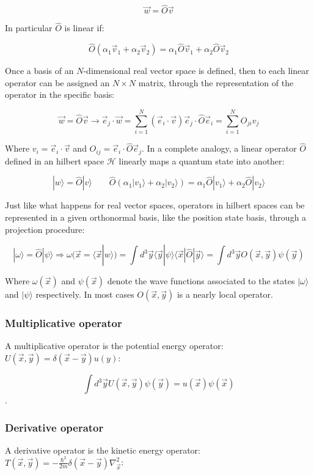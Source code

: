 	$$\vec{w} = \hat{O}\vec{v}$$

	In particular $\hat{O}$ is linear if:

	$$\hat{O}(\alpha_1\vec{v}_1 + \alpha_2\vec{v}_2) = \alpha_1\hat{O}\vec{v}_1 + \alpha_2\hat{O}\vec{v}_2$$

	Once a basis of an $N$-dimensional real vector space is defined, then to each linear operator can be assigned an $N\times N$ matrix, through the representation of the operator in the specific basis:

	$$\vec{w} = \hat{O}\vec{v}\rightarrow \vec{e}_j\cdot\vec{w} = \sum\limits_{i=1}^N(\vec{e}_i\cdot\vec{v})\vec{e}_j\cdot\hat{O}\vec{e}_i = \sum\limits_{i=1}^NO_{ji}v_j$$

	Where $v_i = \vec{e}_i\cdot \vec{v}$ and $O_{ij} = \vec{e}_i\cdot\hat{O}\vec{e}_j$.
	In a complete analogy, a linear operator $\hat{O}$ defined in an hilbert space $\mathcal{H}$ linearly maps a quantum state into another:

	$$|w\rangle = \hat{O}|v\rangle\qquad \hat{O}(\alpha_1|v_1\rangle + \alpha_2|v_2\rangle) = \alpha_1\hat{O}|v_1\rangle +  \alpha_2\hat{O}|v_2\rangle$$

	Just like what happens for real vector spaces, operators in hilbert spaces can be represented in a given orthonormal basis, like the position state basis, through a projection procedure:

	$$|\omega\rangle = \hat{O}|\psi\rangle\Rightarrow \omega(\vec{x} = \langle\vec{x}|w\rangle) = \int d^3\vec{y}\langle\vec{y}|\psi\rangle\langle\vec{x}|\hat{O}|\vec{y}\rangle = \int d^3\vec{y} O(\vec{x}, \vec{y})\psi(\vec{y})$$

	Where $\omega(\vec{x})$ and $\psi(\vec{x})$ denote the wave functions associated to the states $|\omega\rangle$ and $|\psi\rangle$ respectively.
	In most cases $O(\vec{x}, \vec{y})$ is a nearly local operator.

		\subsubsection{Multiplicative operator}
		A multiplicative operator is the potential energy operator: $U(\vec{x}, \vec{y}) = \delta(\vec{x}-\vec{y})u(y)$:

		$$\int d^3\vec{y}U(\vec{x}, \vec{y})\psi(\vec{y}) = u(\vec{x})\psi(\vec{x})$$.

		\subsubsection{Derivative operator}
		A derivative operator is the kinetic energy operator: $T(\vec{x}, \vec{y}) = -\frac{\hbar^2}{2m}\delta(\vec{x}-\vec{y})\nabla^2_{\vec{x}}$:

